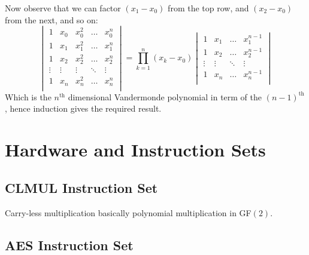 Now observe that we can factor $(x_1-x_0)$ from the top row, 
and $(x_2-x_0)$ from the next,
and so on:
\[
\begin{vmatrix} 
	1&x_0&x_0^2&\dots&x_0^n \\
	1&x_1&x_1^2&\dots&x_1^n \\
	1&x_2&x_2^2&\dots&x_2^n \\
	\vdots&\vdots&\vdots&\ddots&\vdots \\
	1&x_n&x_n^2&\dots&x_n^n \\
\end{vmatrix}  
=\prod_{k=1}^n(x_k-x_0)
\begin{vmatrix} 
	1&x_1&\dots&x_1^{n-1}\\
	1&x_2&\dots&x_2^{n-1} \\
	\vdots&\vdots&\ddots&\vdots \\
	1&x_n&\dots&x_n^{n-1} \\
\end{vmatrix} 
\]
Which is the $n^\text{th}$ dimensional Vandermonde polynomial in term of the $(n-1)^\text{th}$,
hence induction gives the required result.

\section{Hardware and Instruction Sets}
\subsection{CLMUL Instruction Set}
Carry-less multiplication basically polynomial multiplication in GF$(2)$.
\subsection{AES Instruction Set}
